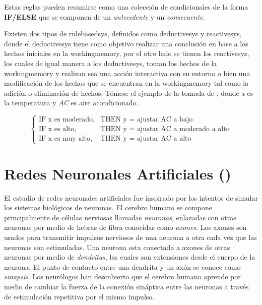 Estas reglas pueden resumirse como una colección de condicionales de la forma \textbf{IF/ELSE} que se componen de un \emph{antecedente} y un \emph{consecuente}.

Existen dos tipos de \gls{rulebasedsys}, definidos como \gls{deductivesys} y \gls{reactivesys}, donde el \gls{deductivesys} tiene como objetivo realizar una conclusión en base a los hechos iniciales en la \gls{workingmemory}, por el otro lado se tienen los \gls{reactivesys}, los cuales de igual manera a los \gls{deductivesys}, toman los hechos de la \gls{workingmemory} y realizan sea una acción interactiva con su entorno o bien una modificación de los hechos que se encuentran en la \gls{workingmemory} tal como la adición o eliminación de hechos. Tómese el ejemplo de la  tomada de \cite{Mendel}, donde \emph{x} es la temperatura y \emph{AC} es aire acondicionado.

\begin{equation} \label{eq:rbs-example}
  \left\{ \begin{array}{ll}
            \text{IF x es moderado,} & \text{THEN y = ajustar AC a bajo} \\
            \text{IF x es alto,}     & \text{THEN y = ajustar AC a moderado a alto} \\
            \text{IF x es muy alto,} & \text{THEN y = ajustar AC a alto} 
          \end{array} \right.
\end{equation}


\section{Redes Neuronales Artificiales ()} \label{sec:ANN}
El estudio de redes neuronales artificiales fue inspirado por los intentos de simular los sistemas biológicos de neuronas. El cerebro humano se compone principalmente de células nerviosas llamadas \emph{neuronas}, enlazadas con otras neuronas por medio de hebras de fibra conocidas como \emph{axones}. Los axones son usados para transmitir impulsos nerviosos de una neurona a otra cada vez que las neuronas son estimuladas. Una neurona esta conectada a axones de otras neuronas por medio de \emph{dendritas}, las cuales son extensiones desde el cuerpo de la neurona. El punto de contacto entre una dendrita y un axón se conoce como \emph{sinapsis}. Los neurólogos han descubierto que el cerebro humano aprende por medio de cambiar la fuerza de la conexión sináptica entre las neuronas a través de estimulación repetitiva por el mismo impulso.

